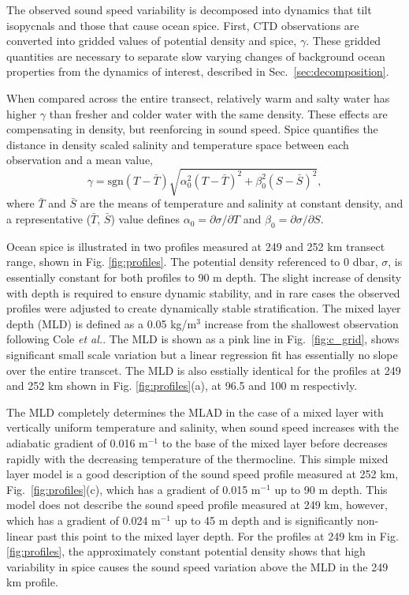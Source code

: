 \documentclass[preprint,NumberedRefs]{JASA}
\begin{document}
The observed sound speed variability is decomposed into dynamics that tilt isopycnals and those that cause ocean spice. First, CTD observations are converted into gridded values of potential density and spice, $\gamma$. These gridded quantities are necessary to separate slow varying changes of background ocean properties from the dynamics of interest\cite{dzieciuch2004}, described in Sec.~\ref{sec:decomposition}.

When compared across the entire transect, relatively warm and salty water has higher $\gamma$ than fresher and colder water with the same density. These effects are compensating in density, but reenforcing in sound speed. Spice quantifies the distance in density scaled salinity and temperature space between each observation and a mean value,
\begin{equation}
    \gamma=\textrm{sgn}(T-\bar{T}) \sqrt{\alpha_0^2(T-\bar{T})^2 +\beta_0^2(S-\bar{S})^2},
    \label{eq:gamma}
\end{equation}
where $\bar{T}$ and $\bar{S}$ are the means of temperature and salinity at constant density, and a representative ($\bar{T}$, $\bar{S}$) value defines $\alpha_0=\partial \sigma / \partial T$ and $\beta_0=\partial \sigma / \partial S$.

Ocean spice is illustrated in two profiles measured at 249 and 252 km transect range, shown in Fig. \ref{fig:profiles}. The potential density referenced to 0 dbar, $\sigma$, is essentially constant for both profiles to 90 m depth. The slight increase of density with depth is required to ensure dynamic stability, and in rare cases the observed profiles were adjusted to create dynamically stable stratification\citep{barker2017stabilizing}. The mixed layer depth (MLD) is defined as a 0.05 kg/m$^3$ increase from the shallowest observation following Cole \emph{et al.}\cite{cole2010seasonal}. The MLD is shown as a pink line in Fig.~\ref{fig:c_grid}, shows significant small scale variation but a linear regression fit has essentially no slope over the entire transcet. The MLD is also esstially identical for the profiles at 249 and 252 km shown in Fig. \ref{fig:profiles}(a), at 96.5 and 100 m respectivly.

The MLD completely determines the MLAD in the case of a mixed layer with vertically uniform temperature and salinity, when sound speed increases with the adiabatic gradient of 0.016 m$^{-1}$ to the base of the mixed layer before decreases rapidly with the decreasing temperature of the thermocline. This simple mixed layer model is a good description of the sound speed profile measured at 252 km, Fig.~\ref{fig:profiles}(c), which has a gradient of 0.015 m$^{-1}$ up to 90 m depth. This model does not describe the sound speed profile measured at 249 km, however, which has a gradient of 0.024 m$^{-1}$ up to 45 m depth and is significantly non-linear past this point to the mixed layer depth. For the profiles at 249 km in Fig. \ref{fig:profiles}, the approximately constant potential density shows that high variability in spice causes the sound speed variation above the MLD in the 249 km profile.
\end{document}
